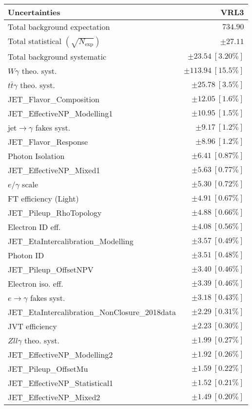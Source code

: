 \begin{tabular}{lr}
\hline
\textbf{Uncertainties} & \textbf{VRL3} \\
\hline
Total background expectation & $734.90$ \\
\hline
Total statistical $(\sqrt{N_\mathrm{exp}})$ & $\pm 27.11$ \\
Total background systematic & $\pm 23.54\ [3.20\%]$ \\
\hline
\hline
$W\gamma$ theo. syst. & $\pm 113.94\ [15.5\%]$ \\
$t\bar{t}\gamma$ theo. syst. & $\pm 25.78\ [3.5\%]$ \\
JET\_Flavor\_Composition & $\pm 12.05\ [1.6\%]$ \\
JET\_EffectiveNP\_Modelling1 & $\pm 10.95\ [1.5\%]$ \\
jet$\to\gamma$ fakes syst. & $\pm 9.17\ [1.2\%]$ \\
JET\_Flavor\_Response & $\pm 8.96\ [1.2\%]$ \\
Photon Isolation & $\pm 6.41\ [0.87\%]$ \\
JET\_EffectiveNP\_Mixed1 & $\pm 5.63\ [0.77\%]$ \\
$e/\gamma$ scale & $\pm 5.30\ [0.72\%]$ \\
FT efficiency (Light) & $\pm 4.91\ [0.67\%]$ \\
JET\_Pileup\_RhoTopology & $\pm 4.88\ [0.66\%]$ \\
Electron ID eff. & $\pm 4.08\ [0.56\%]$ \\
JET\_EtaIntercalibration\_Modelling & $\pm 3.57\ [0.49\%]$ \\
Photon ID & $\pm 3.51\ [0.48\%]$ \\
JET\_Pileup\_OffsetNPV & $\pm 3.40\ [0.46\%]$ \\
Electron iso. eff. & $\pm 3.39\ [0.46\%]$ \\
$e\to\gamma$ fakes syst. & $\pm 3.18\ [0.43\%]$ \\
JET\_EtaIntercalibration\_NonClosure\_2018data & $\pm 2.29\ [0.31\%]$ \\
JVT efficiency & $\pm 2.23\ [0.30\%]$ \\
$Zll\gamma$ theo. syst. & $\pm 1.99\ [0.27\%]$ \\
JET\_EffectiveNP\_Modelling2 & $\pm 1.92\ [0.26\%]$ \\
JET\_Pileup\_OffsetMu & $\pm 1.59\ [0.22\%]$ \\
JET\_EffectiveNP\_Statistical1 & $\pm 1.52\ [0.21\%]$ \\
JET\_EffectiveNP\_Mixed2 & $\pm 1.49\ [0.20\%]$ \\

\end{tabular}
